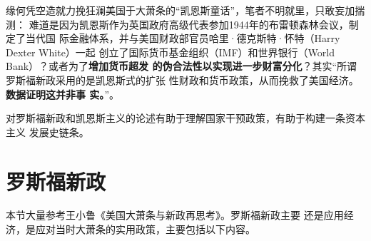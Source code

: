 缘何凭空造就力挽狂澜美国于大萧条的“凯恩斯童话”，笔者不明就里，只敢妄加揣测：
难道是因为凯恩斯作为英国政府高级代表参加1944年的布雷顿森林会议，制定了当代国
际金融体系，并与美国财政部官员哈里·德克斯特·怀特（Harry Dexter White）一起
创立了国际货币基金组织（IMF）和世界银行（World Bank）？或者为了\textbf{增加货币超发
  的伪合法性以实现进一步财富分化}？其实“所谓罗斯福新政采用的是凯恩斯式的扩张
性财政和货币政策，从而挽救了美国经济。\textbf{数据证明这并非事
  实。}”\cite{bijiao202002}。


对罗斯福新政和凯恩斯主义的论述有助于理解国家干预政策，有助于构建一条资本主义
发展史链条。


\section{罗斯福新政}

本节大量参考王小鲁《美国大萧条与新政再思考》\cite{bijiao202002}。罗斯福新政主要
还是应用经济，是应对当时大萧条的实用政策，主要包括以下内容。

